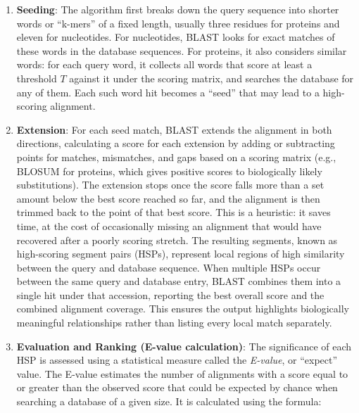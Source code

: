 \begin{enumerate}
    \item \textbf{Seeding}: The algorithm first breaks down the query sequence into shorter words or ``k-mers'' of a fixed length, usually three residues for proteins and eleven for nucleotides. For nucleotides, BLAST looks for exact matches of these words in the database sequences. For proteins, it also considers similar words: for each query word, it collects all words that score at least a threshold $T$ against it under the scoring matrix, and searches the database for any of them.
    Each such word hit becomes a ``seed'' that may lead to a high-scoring alignment.
    
    \item \textbf{Extension}: For each seed match, BLAST extends the alignment in both directions, calculating a score for each extension by adding or subtracting points for matches, mismatches, and gaps based on a scoring matrix (e.g., BLOSUM for proteins, which gives positive scores to biologically likely substitutions). The extension stops once the score falls more than a set amount below the best score reached so far, and the alignment is then trimmed back to the point of that best score. This is a heuristic: it saves time, at the cost of occasionally missing an alignment that would have recovered after a poorly scoring stretch. The resulting segments, known as high-scoring segment pairs (HSPs), represent local regions of high similarity between the query and database sequence. When multiple HSPs occur between the same query and database entry, BLAST combines them into a single hit under that accession, reporting the best overall score and the combined alignment coverage. This ensures the output highlights biologically meaningful relationships rather than listing every local match separately.
    
    \item \textbf{Evaluation and Ranking (E-value calculation)}: The significance of each HSP is assessed using a statistical measure called the \textit{E-value}, or ``expect'' value. The E-value estimates the number of alignments with a score equal to or greater than the observed score that could be expected by chance when searching a database of a given size. It is calculated using the formula:


\end{enumerate}
